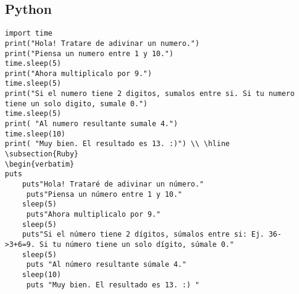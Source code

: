 \documentclass[11pt]{article}
\begin{document}
\subsection{Python}
\begin{verbatim}
import time
print("Hola! Tratare de adivinar un numero.")
print("Piensa un numero entre 1 y 10.")
time.sleep(5)	
print("Ahora multiplicalo por 9.")
time.sleep(5)
print("Si el numero tiene 2 digitos, sumalos entre si. Si tu numero tiene un solo digito, sumale 0.")
time.sleep(5)
print( "Al numero resultante sumale 4.")
time.sleep(10)	
print( "Muy bien. El resultado es 13. :)") \\ \hline
\subsection{Ruby}
\begin{verbatim}
puts
    puts"Hola! Trataré de adivinar un número." 
     puts"Piensa un número entre 1 y 10." 
    sleep(5)	
     puts"Ahora multiplicalo por 9." 
    sleep(5)
    puts"Si el número tiene 2 dígitos, súmalos entre si: Ej. 36->3+6=9. Si tu número tiene un solo dígito, súmale 0." 
    sleep(5)
     puts "Al número resultante súmale 4." 
    sleep(10) 	
     puts "Muy bien. El resultado es 13. :) " 
\end{verbatim}     

\end{document}
